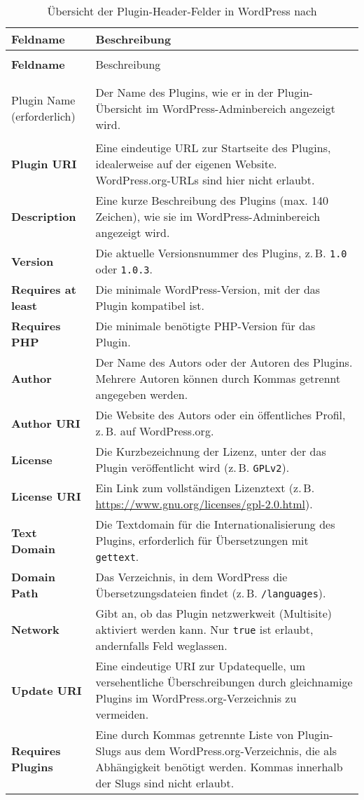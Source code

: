 \begin{longtable}{>{\bfseries}p{4cm} p{10cm}}
 \caption{Übersicht der Plugin-Header-Felder in WordPress nach \cite{WPHeaderReq}} \\
 \hline
 Feldname & Beschreibung \\
 \hline
 \endfirsthead

 \multicolumn{2}{l}{\textit{Fortsetzung von vorheriger Seite}} \\
 \hline
 Feldname & Beschreibung \\
 \hline
 \endhead

 \hline
 \multicolumn{2}{r}{\textit{Fortsetzung auf nächster Seite}} \\
 \endfoot

 \hline
 \endlastfoot

 Plugin Name (erforderlich) & Der Name des Plugins, wie er in der Plugin-Übersicht im WordPress-Adminbereich angezeigt wird. \\
 Plugin URI & Eine eindeutige URL zur Startseite des Plugins, idealerweise auf der eigenen Website. WordPress.org-URLs sind hier nicht erlaubt. \\
 Description & Eine kurze Beschreibung des Plugins (max. 140 Zeichen), wie sie im WordPress-Adminbereich angezeigt wird. \\
 Version & Die aktuelle Versionsnummer des Plugins, z.\,B. \texttt{1.0} oder \texttt{1.0.3}. \\
 Requires at least & Die minimale WordPress-Version, mit der das Plugin kompatibel ist. \\
 Requires PHP & Die minimale benötigte PHP-Version für das Plugin. \\
 Author & Der Name des Autors oder der Autoren des Plugins. Mehrere Autoren können durch Kommas getrennt angegeben werden. \\
 Author URI & Die Website des Autors oder ein öffentliches Profil, z.\,B. auf WordPress.org. \\
 License & Die Kurzbezeichnung der Lizenz, unter der das Plugin veröffentlicht wird (z.\,B. \texttt{GPLv2}). \\
 License URI & Ein Link zum vollständigen Lizenztext (z.\,B. \url{https://www.gnu.org/licenses/gpl-2.0.html}). \\
 Text Domain & Die Textdomain für die Internationalisierung des Plugins, erforderlich für Übersetzungen mit \texttt{gettext}. \\
 Domain Path & Das Verzeichnis, in dem WordPress die Übersetzungsdateien findet (z.\,B. \texttt{/languages}). \\
 Network & Gibt an, ob das Plugin netzwerkweit (Multisite) aktiviert werden kann. Nur \texttt{true} ist erlaubt, andernfalls Feld weglassen. \\
 Update URI & Eine eindeutige URI zur Updatequelle, um versehentliche Überschreibungen durch gleichnamige Plugins im WordPress.org-Verzeichnis zu vermeiden. \\
 Requires Plugins & Eine durch Kommas getrennte Liste von Plugin-Slugs aus dem WordPress.org-Verzeichnis, die als Abhängigkeit benötigt werden. Kommas innerhalb der Slugs sind nicht erlaubt. \\
\end{longtable}

